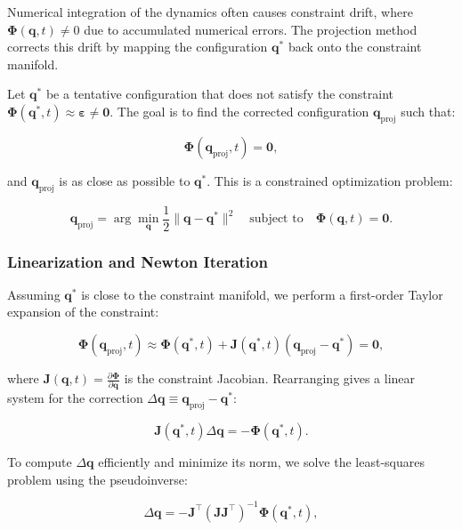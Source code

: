 \documentclass{article}
\begin{document}
Numerical integration of the dynamics often causes constraint drift, where \(
\bm{\Phi}(\bm{q}, t) \neq 0 \) due to accumulated numerical errors. The
projection method corrects this drift by mapping the configuration \( \bm{q}^*
\) back onto the constraint manifold.

Let \( \bm{q}^* \) be a tentative configuration that does not satisfy the
constraint \( \bm{\Phi}(\bm{q}^*, t) \approx \bm{\varepsilon} \neq \bm{0} \).
The goal is to find the corrected configuration \( \bm{q}_{\text{proj}} \) such
that:

\begin{equation}
    \bm{\Phi}(\bm{q}_{\text{proj}}, t) = \bm{0},
\end{equation}

and \( \bm{q}_{\text{proj}} \) is as close as possible to \( \bm{q}^* \). This
is a constrained optimization problem:

\begin{equation}
    \bm{q}_{\text{proj}} = \arg\min_{\bm{q}} \frac{1}{2} \| \bm{q} - \bm{q}^* \|^2 \quad \text{subject to} \quad \bm{\Phi}(\bm{q}, t) = \bm{0}.
\end{equation}

\subsubsection*{Linearization and Newton Iteration}

Assuming \( \bm{q}^* \) is close to the constraint manifold, we perform a
first-order Taylor expansion of the constraint:

\begin{equation}
    \bm{\Phi}(\bm{q}_{\text{proj}}, t) \approx \bm{\Phi}(\bm{q}^*, t) + \bm{J}(\bm{q}^*, t)(\bm{q}_{\text{proj}} - \bm{q}^*) = \bm{0},
\end{equation}

where \( \bm{J}(\bm{q}, t) = \frac{\partial \bm{\Phi}}{\partial \bm{q}} \) is
the constraint Jacobian. Rearranging gives a linear system for the correction \(
\Delta \bm{q} \equiv \bm{q}_{\text{proj}} - \bm{q}^* \):

\begin{equation}
    \bm{J}(\bm{q}^*, t) \Delta \bm{q} = -\bm{\Phi}(\bm{q}^*, t).
\end{equation}

To compute \( \Delta \bm{q} \) efficiently and minimize its norm, we solve the
least-squares problem using the pseudoinverse:

\begin{equation}
    \Delta \bm{q} = -\bm{J}^\top(\bm{J} \bm{J}^\top)^{-1} \bm{\Phi}(\bm{q}^*, t),
\end{equation}
\end{document}
